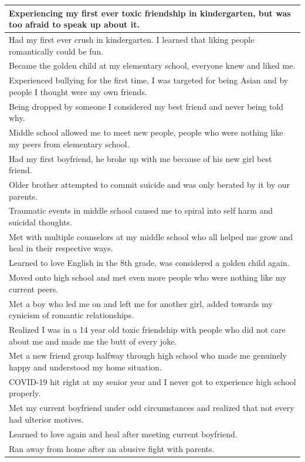 \documentclass[
  .7em,
  letterpaper,
  DIV=11,
  numbers=noendperiod]{scrartcl}
\begin{document}
\begin{table}
\begin{tabular}{l}
\hline
Experiencing my first ever toxic friendship in kindergarten, but was too afraid to speak up about it.\\
\hline
Had my first ever crush in kindergarten. I learned that liking people romantically could be fun.\\
\hline
Became the golden child at my elementary school, everyone knew and liked me.\\
\hline
Experienced bullying for the first time, I was targeted for being Asian and by people I thought were my own friends.\\
\hline
Being dropped by someone I considered my best friend and never being told why.\\
\hline
Middle school allowed me to meet new people, people who were nothing like my peers from elementary school.\\
\hline
Had my first boyfriend, he broke up with me because of his new girl best friend.\\
\hline
Older brother attempted to commit suicide and was only berated by it by our parents.\\
\hline
Traumatic events in middle school caused me to spiral into self harm and suicidal thoughts.\\
\hline
Met with multiple counselors at my middle school who all helped me grow and heal in their respective ways.\\
\hline
Learned to love English in the 8th grade, was considered a golden child again.\\
\hline
Moved onto high school and met even more people who were nothing like my current peers.\\
\hline
Met a boy who led me on and left me for another girl, added towards my cynicism of romantic relationships.\\
\hline
Realized I was in a 14 year old toxic friendship with people who did not care about me and made me the butt of every joke.\\
\hline
Met a new friend group halfway through high school who made me genuinely happy and understood my home situation.\\
\hline
COVID-19 hit right at my senior year and I never got to experience high school properly.\\
\hline
Met my current boyfriend under odd circumstances and realized that not every had ulterior motives.\\
\hline
Learned to love again and heal after meeting current boyfriend.\\
\hline
Ran away from home after an abusive fight with parents.\\

\end{tabular}
\end{table}
\end{document}
